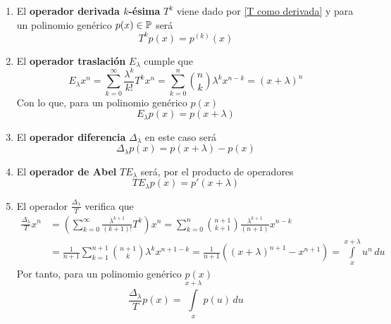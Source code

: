\begin{ej}
    \begin{enumerate}
        \item El \textbf{operador derivada $k$-ésima} $T^k$ viene dado por \ref{T como derivada} y para un polinomio genérico $p(x) \in \mathbb{P}$ será
        \begin{equation} \label{operador derivada}
            T^k p(x) = p^{(k)}(x)
        \end{equation}
        \item El \textbf{operador traslación} $E_\lambda$ cumple que
        \begin{equation*}
            E_{\lambda} x^n = \sum_{k=0}^\infty \frac{\lambda^k}{k!} T^k x^n = \sum_{k=0}^n \binom{n}{k}\lambda^k x^{n-k} = (x+ \lambda )^n
        \end{equation*} 
        Con lo que, para un polinomio genérico $p(x)$
        \begin{equation} \label{operador traslacion}
            E_{\lambda} p(x) = p(x+\lambda)
        \end{equation}
        \item El \textbf{operador diferencia} $\Delta_{\lambda}$ en este caso será
        \begin{equation}\label{operador diferencia}
            \Delta_{\lambda} p(x) = p(x+ \lambda) - p(x)
        \end{equation}
        \item El \textbf{operador de Abel} $TE_{\lambda}$ será, por el producto de operadores
        \begin{equation}\label{operador de Abel}
            TE_{\lambda}p(x) = p'(x+ \lambda)
        \end{equation}
        \item El operador $\frac{\Delta_{\lambda}}{T}$ verifica que
        \begin{align*}
            \frac{\Delta_{\lambda}}{T}x^n & = \left(\sum_{k=0}^\infty \frac{\lambda^{k+1}}{(k+1)!}T^k\right) x^n = \sum_{k=0}^n \binom{n+1}{k+1} \frac{\lambda^{k+1}}{(n+1)}x^{n-k}\\
            & = \frac{1}{n+1}\sum_{k=1}^{n+1} \binom{n+1}{k} \lambda^k x^{n+1-k} = \frac{1}{n+1}((x+ \lambda )^{n+1} - x^{n+1}) = \int\limits_{x}^{x+ \lambda} u^n \, du
        \end{align*}
        Por tanto, para un polinomio genérico $p(x)$
        \begin{equation}\label{operador integral media}
           \frac{\Delta_{\lambda}}{T}p(x) = \int\limits_{x}^{x+ \lambda} p(u) \, du
        \end{equation}
    \end{enumerate}
\end{ej}
